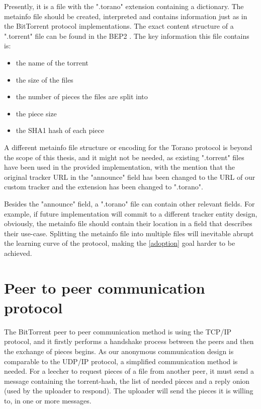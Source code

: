 Presently, it is a file with the ".torano" extension containing a dictionary. The metainfo file should be created, interpreted and contains information just as in the BitTorrent protocol implementations. The exact content structure of a ".torrent" file can be found in the BEP2 \cite{bittorrent}. The key information this file contains is:
\begin{itemize}
    \item the name of the torrent
    \item the size of the files
    \item the number of pieces the files are split into
    \item the piece size
    \item the SHA1 hash of each piece 
\end{itemize}

A different metainfo file structure or encoding for the Torano protocol is beyond the scope of this thesis, and it might not be needed, as existing ".torrent" files have been used in the provided implementation, with the mention that the original tracker URL in the "announce" field has been changed to the URL of our custom tracker and the extension has been changed to ".torano". 

Besides the "announce" field, a ".torano" file can contain other relevant fields. For example, if future implementation will commit to a different tracker entity design, obviously, the metainfo file should contain their location in a field that describes their use-case. Splitting the metainfo file into multiple files will inevitable abrupt the learning curve of the protocol, making the \ref{adoption} goal harder to be achieved. 

\section{Peer to peer communication protocol}
The BitTorrent peer to peer communication method is using the TCP/IP protocol, and it firstly performs a handshake process between the peers and then the exchange of pieces begins. As our anonymous communication design is comparable to the UDP/IP protocol, a simplified communication method is needed. For a leecher to request pieces of a file from another peer, it must send a message containing the torrent-hash, the list of needed pieces and a reply onion (used by the uploader to respond). The uploader will send the pieces it is willing to, in one or more messages. 

